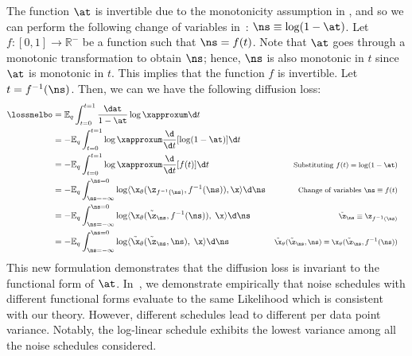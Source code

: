 \documentclass{article} %
\def\owt{OWT}
\begin{document}
{\begin{appendices}
The function $\at$ is invertible due to the monotonicity assumption in , and so we can perform the following change of variables in~:
$\ns \equiv \log(1 - \at)$. Let $f:[0, 1] \to \mathbb{R}^{-}$ be a function such that $\ns = f(t)$.
Note that $\at$ goes through a monotonic transformation to obtain $\ns$; hence, $\ns$ is also monotonic in $t$ since $\at$ is monotonic in $t$. This implies that the function $f$ is invertible. Let $t = f^{-1}(\ns)$. Then, we can we have the following diffusion loss:
\begin{align}
    \lossnelbo
    & = \mathbb{E}_{q}\int_{t=0}^{t=1} \frac{\dat}{1 - \at} \log \xapproxum \d t & \nonumber \\
    & = - \mathbb{E}_{q}\int_{t=0}^{t=1} \log \xapproxum \frac{\d}{\d t} [\log(1 - \at)] \d t & \nonumber \\
    & = - \mathbb{E}_{q}\int_{t=0}^{t=1} \log \xapproxum \frac{\d}{\d t} [f(t)] \d t & \text{\footnotesize Substituting $f(t) = \log(1 - \at)$} & \nonumber \\
    & = - \mathbb{E}_{q}\int_{\ns = -\infty}^{\ns = 0} \log \langle \x_{\theta}(\z_{f^{-1}(\ns)}, f^{-1}(\ns)), \x \rangle \d \ns & \text{\footnotesize Change of variables $\ns \equiv f(t)$} \nonumber \\
    & = - \mathbb{E}_{q}\int_{\ns = -\infty}^{\ns = 0} \log \langle {\x}_{\theta}(\tilde{\z}_\ns, f^{-1}(\ns)), \; \x \rangle \d \ns & \text{\footnotesize $\tilde{\z}_\ns \equiv \z_{f^{-1}(\ns)}$} \nonumber \\
    & = - \mathbb{E}_{q}\int_{\ns = -\infty}^{\ns = 0} \log \langle \tilde{\x}_{\theta}(\tilde{\z}_\ns, \ns), \; \x \rangle \d \ns & \text{\footnotesize $\tilde{\x}_{\theta}(\tilde{\z}_\ns, \ns) \equiv {\x}_{\theta}(\tilde{\z}_\ns, f^{-1}(\ns))$} 
\end{align}
This new formulation demonstrates that the diffusion loss is invariant to the functional form of $\at$.
In~, we demonstrate empirically that noise schedules with different functional forms evaluate to the same Likelihood which is consistent with our theory.
However, different schedules lead to different per data point variance. Notably, the log-linear schedule exhibits the lowest variance among all the noise schedules considered.%
\begin{table}[!h]
  \caption{Likelihood in bits per dimension (BPD) for different noise schedules on \owt{} dataset, is reported along with the mean and variance associated with each noise schedule per data point. We empirically observe that noise schedules with different functional forms yield the same likelihood, consistent with our theory in~; however, different schedules result in different variances.}

\end{table}
\end{appendices}}
\end{document}
